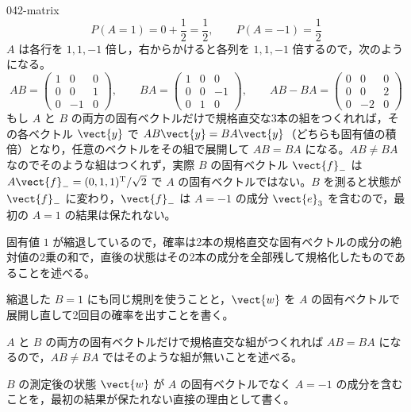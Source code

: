 \documentclass[uplatex,dvipdfmx,a4paper,11pt]{jsarticle}
\begin{document}
\begin{kaisetsu}{042-matrix}
\[ P(A=1)=0+\frac{1}{2}=\frac{1}{2},\qquad P(A=-1)=\frac{1}{2} \]
 $A$ は各行を $1,1,-1$ 倍し，右からかけると各列を $1,1,-1$ 倍するので，次のようになる。
\[ AB=\begin{pmatrix}1&0&0\\0&0&1\\0&-1&0\end{pmatrix},\qquad BA=\begin{pmatrix}1&0&0\\0&0&-1\\0&1&0\end{pmatrix},\qquad AB-BA=\begin{pmatrix}0&0&0\\0&0&2\\0&-2&0\end{pmatrix} \]
もし $A$ と $B$ の両方の固有ベクトルだけで規格直交な3本の組をつくれれば，その各ベクトル $\vect{y}$ で $AB\vect{y}=BA\vect{y}$（どちらも固有値の積倍）となり，任意のベクトルをその組で展開して $AB=BA$ になる。$AB\ne BA$ なのでそのような組はつくれず，実際 $B$ の固有ベクトル $\vect{f}_{-}$ は $A\vect{f}_{-}=(0,1,1)^{\mathrm{T}}/\sqrt{2}$ で $A$ の固有ベクトルではない。$B$ を測ると状態が $\vect{f}_{-}$ に変わり，$\vect{f}_{-}$ は $A=-1$ の成分 $\vect{e}_{3}$ を含むので，最初の $A=1$ の結果は保たれない。
\begin{ronten}
  \item {} 固有値 $1$ が縮退しているので，確率は2本の規格直交な固有ベクトルの成分の絶対値の2乗の和で，直後の状態はその2本の成分を全部残して規格化したものであることを述べる。
  \item {} 縮退した $B=1$ にも同じ規則を使うことと，$\vect{w}$ を $A$ の固有ベクトルで展開し直して2回目の確率を出すことを書く。
  \item {} $A$ と $B$ の両方の固有ベクトルだけで規格直交な組がつくれれば $AB=BA$ になるので，$AB\ne BA$ ではそのような組が無いことを述べる。
  \item {} $B$ の測定後の状態 $\vect{w}$ が $A$ の固有ベクトルでなく $A=-1$ の成分を含むことを，最初の結果が保たれない直接の理由として書く。

\end{ronten}
\end{kaisetsu}
\end{document}
